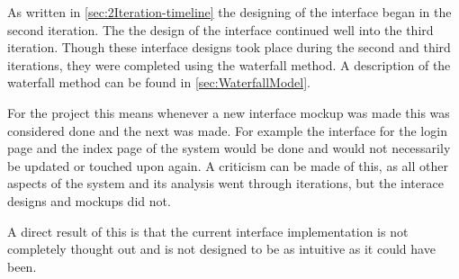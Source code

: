 As written in \cref{sec:2Iteration-timeline} the designing of the interface began in the second iteration.
The the design of the interface continued well into the third iteration.
Though these interface designs took place during the second and third iterations, they were completed using the waterfall method.
A description of the waterfall method can be found in \cref{sec:WaterfallModel}.

For the project this means whenever a new interface mockup was made this was considered done and the next was made.
For example the interface for the login page and the index page of the system would be done and would not necessarily be updated or touched upon again.
A criticism can be made of this, as all other aspects of the system and its analysis went through iterations, but the interace designs and mockups did not.

A direct result of this is that the current interface implementation is not completely thought out and is not designed to be as intuitive as it could have been.
